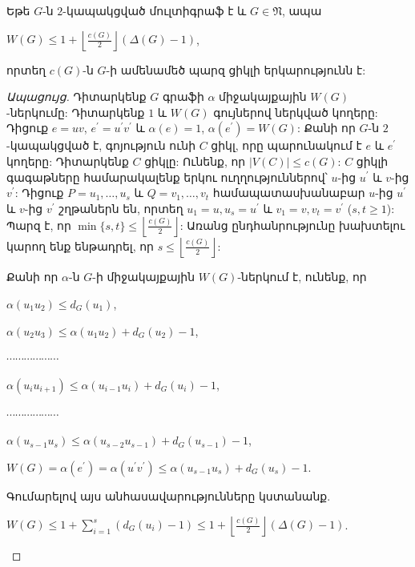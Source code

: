 \begin{theorem}
\label{t1_upper_circumference} Եթե $G$-ն $2$-կապակցված մուլտիգրաֆ է և $G\in \mathfrak{N}$, ապա 
\begin{center}
$W(G)\leq 1+\left\lfloor \frac{c(G)}{2}\right\rfloor(\Delta(G)-1)$,
\end{center}
որտեղ $c(G)$-ն $G$-ի ամենամեծ պարզ ցիկլի երկարությունն է:
\end{theorem}
\begin{proof}[Ապացույց] Դիտարկենք $G$ գրաֆի $\alpha$ միջակայքային $W(G)$-ներկումը: Դիտարկենք  $1$ և $W(G)$ գույներով ներկված կողերը: Դիցուք $e=uv$,
$e^{\prime}=u^{\prime}v^{\prime}$ և $\alpha(e)=1$,
$\alpha(e^{\prime})=W(G)$: Քանի որ $G$-ն $2$-կապակցված է, գոյություն ունի $C$ ցիկլ, որը պարունակում է $e$ և $e^{\prime}$ կողերը: Դիտարկենք $C$ ցիկլը: Ունենք, որ $\vert V(C)\vert\leq c(G)$: $C$ ցիկլի գագաթները համարակալենք երկու ուղղություններով՝ $u$-ից $u^{\prime}$ և $v$-ից $v^{\prime}$: Դիցուք 
$P=u_{1},\ldots,u_{s}$ և $Q=v_{1},\ldots,v_{t}$ համապատասխանաբար
$u$-ից $u^{\prime}$ և $v$-ից $v^{\prime}$ շղթաներն են, որտեղ
$u_{1}=u,u_{s}=u^{\prime}$ և $v_{1}=v,v_{t}=v^{\prime}$
($s,t\geq 1$): Պարզ է, որ $\min\{s,t\}\leq \left\lfloor
\frac{c(G)}{2}\right\rfloor$: Առանց ընդհանրությունը խախտելու կարող ենք ենթադրել, որ $s\leq \left\lfloor \frac{c(G)}{2}\right\rfloor$:

Քանի որ $\alpha$-ն $G$-ի միջակայքային $W(G)$-ներկում է, ունենք, որ

\begin{center}
$\alpha(u_{1}u_{2})\leq d_{G}(u_{1})$,

$\alpha(u_{2}u_{3})\leq \alpha(u_{1}u_{2})+ d_{G}(u_{2})-1$,

$\cdots \cdots \cdots \cdots \cdots \cdots$

$\alpha(u_{i}u_{i+1})\leq \alpha(u_{i-1}u_{i})+ d_{G}(u_{i})-1$,

$\cdots \cdots \cdots \cdots \cdots \cdots$

$\alpha(u_{s-1}u_{s})\leq \alpha(u_{s-2}u_{s-1})+ d_{G}(u_{s-1})-1$,

$W(G)=\alpha(e^{\prime})=\alpha(u^{\prime}v^{\prime})\leq
\alpha(u_{s-1}u_{s})+ d_{G}(u_{s})-1$.

\end{center}

Գումարելով այս անհասավարությունները կստանանք.

\begin{center}
$W(G)\leq 1+{\sum\limits_{i=1}^{s}\left(d_{G}(u_{i})-1\right)}\leq
1+\left\lfloor\frac{c(G)}{2}\right\rfloor(\Delta(G)-1)$.
\end{center}
\end{proof}

